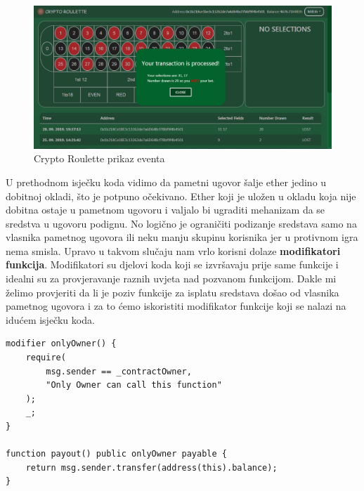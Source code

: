 \documentclass[a4paper,oneside,12pt]{memoir} %
\begin{document}
\begin{figure}[H]
\centering
\includegraphics[scale=0.3]{result}
\caption{Crypto Roulette prikaz eventa}
\label{fig:result}
\end{figure}

U prethodnom isječku koda vidimo da pametni ugovor šalje ether jedino u dobitnoj okladi, što je potpuno očekivano. Ether koji je uložen u okladu koja nije dobitna ostaje u pametnom ugovoru i valjalo bi ugraditi mehanizam da se sredstva u ugovoru podignu. No logično je ograničiti podizanje sredstava samo na vlasnika pametnog ugovora ili neku manju skupinu korisnika jer u protivnom igra nema smisla. Upravo u takvom slučaju nam vrlo korisni dolaze \textbf{modifikatori funkcija}. Modifikatori su djelovi koda koji se izvršavaju prije same funkcije i idealni su za provjeravanje raznih uvjeta nad pozvanom funkcijom. Dakle mi želimo provjeriti da li je poziv funkcije za isplatu sredstava došao od vlasnika pametnog ugovora i za to ćemo iskoristiti modifikator funkcije koji se nalazi na idućem isječku koda.

\begin{lstlisting}[caption=Ključna riječ \lstinline{modifier} označuje da slijedi modifikator funkcije. U \lstinline{require} naredbu možemo ubaciti sve uvjete koji želimo da budu zadovoljeni\, no tu samo zahtjevamo da je pozivatelj funkcije \lstinline{msg.sender} ujedno i vlasnik pametnog \lstinline{_contractOwner} (lokalna varijabla koja se postavlja u kontruktoru; nema jednostavnog načina za naći vlasnika pametnog ugovora osim ići kroz prošlost transakcija koje uključuju ugovor\, tako da je ovo mnogo jednostavnije i brže.) \\Funkcija payout uplaćuje ether sa ugovora \lstinline{address(this).balance} pozivatelja funkcije (tj. vlasnika ugovora), label={code:modif}, hspace={0.5cm}]
modifier onlyOwner() {
    require(
        msg.sender == _contractOwner,
        "Only Owner can call this function"
    );
    _;
}
    
function payout() public onlyOwner payable {
    return msg.sender.transfer(address(this).balance);
}
\end{lstlisting}
\end{document}
